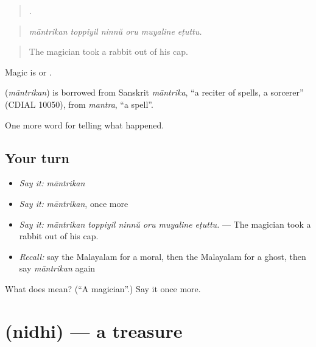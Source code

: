 \begin{quote}
     .
\end{quote}

\begin{quote}
\emph{māntrikan toppiyil ninnŭ oru muyaline eṭuttu.}
\end{quote}

\begin{quote}
The magician took a rabbit out of his cap.
\end{quote}

Magic is  or .

\begin{cousinweb}
\textbf{} (\emph{māntrikan}) is borrowed from Sanskrit \emph{māntrika}, \textquotedblleft{}a reciter of spells, a sorcerer\textquotedblright{} (CDIAL 10050), from \emph{mantra}, \textquotedblleft{}a spell\textquotedblright{}.
\end{cousinweb}

\begin{grammarlens}[title={What you've built}]
One more word for telling what happened.
\end{grammarlens}

\subsection*{Your turn}
\begin{itemize}
\raggedright
  \item \emph{Say it:} \emph{māntrikan}
  \item \emph{Say it:} \emph{māntrikan}, once more
  \item \emph{Say it:} \emph{māntrikan toppiyil ninnŭ oru muyaline eṭuttu.} — The magician took a rabbit out of his cap.
  \item \emph{Recall:} say the Malayalam for a moral, then the Malayalam for a ghost, then say \emph{māntrikan} again
\end{itemize}

\begin{tcolorbox}[breakable,colback=teal!4,colframe=teal!35!black,title={Before you move on}]
What does  mean? (\textquotedblleft{}A magician\textquotedblright{}.) Say it once more.
\end{tcolorbox}
\section[\texorpdfstring{\ml{നിധി} (nidhi)}{നിധി (nidhi)}]{ (nidhi) — a treasure}

